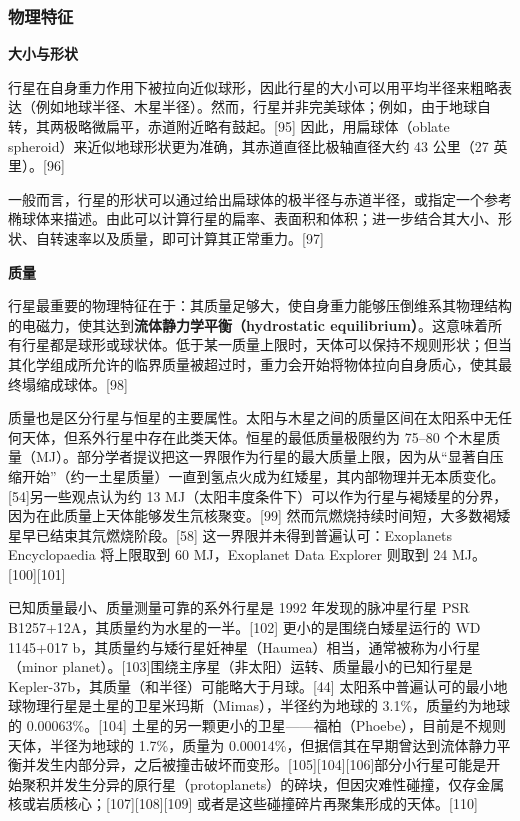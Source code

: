 \subsubsection{物理特征}
\textbf{大小与形状}

行星在自身重力作用下被拉向近似球形，因此行星的大小可以用平均半径来粗略表达（例如地球半径、木星半径）。然而，行星并非完美球体；例如，由于地球自转，其两极略微扁平，赤道附近略有鼓起。[95] 因此，用扁球体（oblate spheroid）来近似地球形状更为准确，其赤道直径比极轴直径大约 43 公里（27 英里）。[96]

一般而言，行星的形状可以通过给出扁球体的极半径与赤道半径，或指定一个参考椭球体来描述。由此可以计算行星的扁率、表面积和体积；进一步结合其大小、形状、自转速率以及质量，即可计算其正常重力。[97]

\textbf{质量}

行星最重要的物理特征在于：其质量足够大，使自身重力能够压倒维系其物理结构的电磁力，使其达到\textbf{流体静力学平衡（hydrostatic equilibrium）}。这意味着所有行星都是球形或球状体。低于某一质量上限时，天体可以保持不规则形状；但当其化学组成所允许的临界质量被超过时，重力会开始将物体拉向自身质心，使其最终塌缩成球体。[98]

质量也是区分行星与恒星的主要属性。太阳与木星之间的质量区间在太阳系中无任何天体，但系外行星中存在此类天体。恒星的最低质量极限约为 75–80 个木星质量（MJ）。部分学者提议把这一界限作为行星的最大质量上限，因为从“显著自压缩开始”（约一土星质量）一直到氢点火成为红矮星，其内部物理并无本质变化。[54]另一些观点认为约 13 MJ（太阳丰度条件下）可以作为行星与褐矮星的分界，因为在此质量上天体能够发生氘核聚变。[99] 然而氘燃烧持续时间短，大多数褐矮星早已结束其氘燃烧阶段。[58] 这一界限并未得到普遍认可：Exoplanets Encyclopaedia 将上限取到 60 MJ，Exoplanet Data Explorer 则取到 24 MJ。[100][101]

已知质量最小、质量测量可靠的系外行星是 1992 年发现的脉冲星行星 PSR B1257+12A，其质量约为水星的一半。[102] 更小的是围绕白矮星运行的 WD 1145+017 b，其质量约与矮行星妊神星（Haumea）相当，通常被称为小行星（minor planet）。[103]围绕主序星（非太阳）运转、质量最小的已知行星是 Kepler-37b，其质量（和半径）可能略大于月球。[44] 太阳系中普遍认可的最小地球物理行星是土星的卫星米玛斯（Mimas），半径约为地球的 3.1\%，质量约为地球的 0.00063\%。[104] 土星的另一颗更小的卫星——福柏（Phoebe），目前是不规则天体，半径为地球的 1.7\%，质量为 0.00014\%，但据信其在早期曾达到流体静力平衡并发生内部分异，之后被撞击破坏而变形。[105][104][106]部分小行星可能是开始聚积并发生分异的原行星（protoplanets）的碎块，但因灾难性碰撞，仅存金属核或岩质核心；[107][108][109] 或者是这些碰撞碎片再聚集形成的天体。[110]

